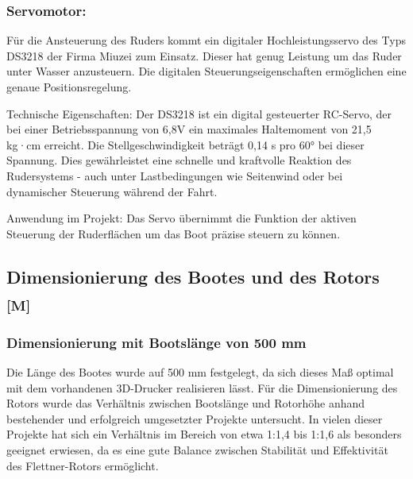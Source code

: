 \documentclass[a4paper,12pt]{article}
\begin{document}
    
    \subsubsection{Servomotor:}
    \label{sec:Servomotor}
    Für die Ansteuerung des Ruders kommt ein digitaler Hochleistungsservo des Typs DS3218 der Firma Miuzei zum Einsatz. Dieser hat genug Leistung um das Ruder unter Wasser anzusteuern. Die digitalen Steuerungseigenschaften ermöglichen eine genaue Positionsregelung.\cite{Datenblatt_Servomotor}\newline

    Technische Eigenschaften: Der DS3218 ist ein digital gesteuerter RC-Servo, der bei einer Betriebsspannung von 6,8V ein maximales Haltemoment von 21,5 kg·cm erreicht. Die Stellgeschwindigkeit beträgt 0,14 s pro 60° bei dieser Spannung. Dies gewährleistet eine schnelle und kraftvolle Reaktion des Rudersystems - auch unter Lastbedingungen wie Seitenwind oder bei dynamischer Steuerung während der Fahrt.\cite{Datenblatt_Servomotor}\newline
    
    Anwendung im Projekt: Das Servo übernimmt die Funktion der aktiven Steuerung der Ruderflächen um das Boot präzise steuern zu können.
    
    

\newpage

\subsection{\texorpdfstring{Dimensionierung des Bootes und des Rotors \textsubscript{[M]}}{Dimensionierung des Bootes und des Rotors [M]}}
\label{sec:Dimensionierung des Bootes}
\subsubsection{Dimensionierung mit Bootslänge von 500 mm}

Die Länge des Bootes wurde auf 500 mm festgelegt, da sich dieses Maß optimal mit dem vorhandenen 3D-Drucker realisieren lässt. Für die Dimensionierung des Rotors wurde das Verhältnis zwischen Bootslänge und Rotorhöhe anhand bestehender und erfolgreich umgesetzter Projekte untersucht. In vielen dieser Projekte hat sich ein Verhältnis im Bereich von etwa 1:1,4 bis 1:1,6 als besonders geeignet erwiesen, da es eine gute Balance zwischen Stabilität und Effektivität des Flettner-Rotors ermöglicht.\cite{Flettner_Uni_Flensburg}\newline
\end{document}
